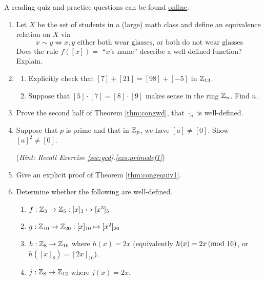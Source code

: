 % 



\begin{exercises}{}{}
	A reading quiz and practice questions can be found \href{http://www.math.uci.edu/~ndonalds/math13/selftest/7-4-welldefn.html}{online}.

	\begin{enumerate}
	  \item Let $X$ be the set of students in a (large) math class and define an equivalence relation on $X$ via
	  \[
	  	x\sim y\iff x,y\text{ either both wear glasses, or both do not wear glasses}
	  \]
	  Does the rule $f([x])=$ ``$x$'s name'' describe a well-defined function? Explain.
	  
	  \item\begin{enumerate}
	    \item Explicitly check that $[7]+[21]=[98]+[-5]$ in $\mathbb{Z}_{13}$.
	    \item Suppose that $[5]\cdot[7]=[8]\cdot[9]$ makes sense in the ring $\mathbb{Z}_n$. Find $n$.
	  \end{enumerate}
	  

	  \item Prove the second half of Theorem \ref{thm:congwd}, that $\cdot_n$ is well-defined.

	  
	  \item Suppose that $p$ is prime and that in $\mathbb{Z}_p$, we have $[a] \neq [0]$. Show $[a]^2 \neq [0]$.\par
	  (\emph{Hint: Recall Exercise \ref*{sec:gcd}.\ref{exs:primedef1}})
	  
	  
	  \item Give an explicit proof of Theorem \ref{thm:congequiv1}.
	 
	
		\item Determine whether the following are well-defined.
		\begin{enumerate}
		  \item $f:\mathbb{Z}_3\to\mathbb{Z}_5:[x]_3\mapsto [x^3]_5$
			\item $g:\mathbb{Z}_{10}\to\mathbb{Z}_{20}:[x]_{10}\mapsto [x^2]_{20}$
			\item $h:\mathbb{Z}_8\to\mathbb{Z}_{16}$ where $h(x)=2x$ \hfill (equivalently $h(x)=2x\negthickspace\pmod{16}$, or $h([x]_8)=[2x]_{16}$).
			\item $j:\mathbb{Z}_8\to\mathbb{Z}_{12}$ where $j(x)=2x$.
		\end{enumerate}
		

\end{enumerate}
\end{exercises}
